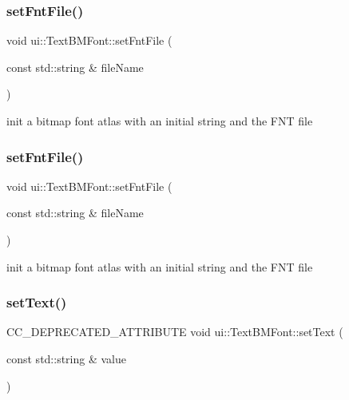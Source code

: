 \subsubsection{\texorpdfstring{set\+Fnt\+File()}{setFntFile()}\hspace{0.1cm}{\footnotesize\ttfamily [1/2]}}
{\footnotesize\ttfamily void ui\+::\+Text\+B\+M\+Font\+::set\+Fnt\+File (\begin{DoxyParamCaption}\item[{const std\+::string \&}]{file\+Name }\end{DoxyParamCaption})}

init a bitmap font atlas with an initial string and the F\+NT file \mbox{\label{classui_1_1TextBMFont_adaef5e07e587002487250c639a51f4e8}} 
\subsubsection{\texorpdfstring{set\+Fnt\+File()}{setFntFile()}\hspace{0.1cm}{\footnotesize\ttfamily [2/2]}}
{\footnotesize\ttfamily void ui\+::\+Text\+B\+M\+Font\+::set\+Fnt\+File (\begin{DoxyParamCaption}\item[{const std\+::string \&}]{file\+Name }\end{DoxyParamCaption})}

init a bitmap font atlas with an initial string and the F\+NT file \mbox{\label{classui_1_1TextBMFont_a7709799981f60b2586798726a674946f}} 
\subsubsection{\texorpdfstring{set\+Text()}{setText()}\hspace{0.1cm}{\footnotesize\ttfamily [1/2]}}
{\footnotesize\ttfamily C\+C\+\_\+\+D\+E\+P\+R\+E\+C\+A\+T\+E\+D\+\_\+\+A\+T\+T\+R\+I\+B\+U\+TE void ui\+::\+Text\+B\+M\+Font\+::set\+Text (\begin{DoxyParamCaption}\item[{const std\+::string \&}]{value }\end{DoxyParamCaption})\hspace{0.3cm}{\ttfamily [inline]}}

